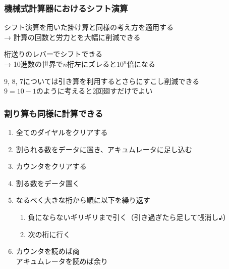 \documentclass[
  lualatex,
  aspectratio=169,
  fleqn,
  14pt
]{beamer}
\begin{document}
\begin{frame}
  \frametitle{機械式計算器におけるシフト演算}

  シフト演算を用いた掛け算と同様の考え方を適用する\\
  \hspace{2.5\zw}→ 計算の回数と労力とを大幅に削減できる

  桁送りのレバーでシフトできる\\
  \hspace{2.5\zw}→ 10進数の世界で$n$桁左にズレると$10^n$倍になる

  9, 8, 7については引き算を利用するとさらにすこし削減できる\\
  \hspace{2.5\zw}$9=10-1$のように考えると2回廻すだけでよい

\end{frame}

\begin{frame}
  \frametitle{割り算も同様に計算できる}

  \begin{enumerate}
    \item
      全てのダイヤルをクリアする
    \item
      割られる数をデータに置き、アキュムレータに足し込む
    \item
      カウンタをクリアする
    \item
      割る数をデータ置く
    \item
      なるべく大きな桁から順に以下を繰り返す
      \begin{enumerate}
        \item
          負にならないギリギリまで引く（引き過ぎたら足して帳消し♪）
        \item
          次の桁に行く
      \end{enumerate}
    \item
      カウンタを読めば商\\
      アキュムレータを読めば余り
  \end{enumerate}

\end{frame}
\end{document}
